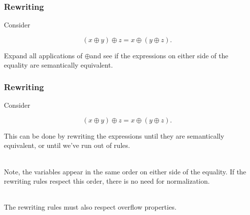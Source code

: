 \begin{frame}[plain]

\frametitle{Rewriting}

Consider

\[\left(x\oplus y\right)\oplus z = x \oplus \left(y \oplus z\right).\]

Expand all applications of $\oplus$\footnotemark[4] and see if the expressions
on either side of the equality are semantically equivalent.


\end{frame}

\begin{frame}[plain]

\frametitle{Rewriting}

Consider

\[\left(x\oplus y\right)\oplus z = x \oplus \left(y \oplus z\right).\]

This can be done by rewriting the expressions until they are semantically
equivalent, or until we've run out of rules.

\ \\

Note, the variables appear in the same order on either side of the equality. If
the rewriting rules respect this order, there is no need for normalization.

\ \\

The rewriting rules must also respect overflow properties\footnotemark[5].


\end{frame}

